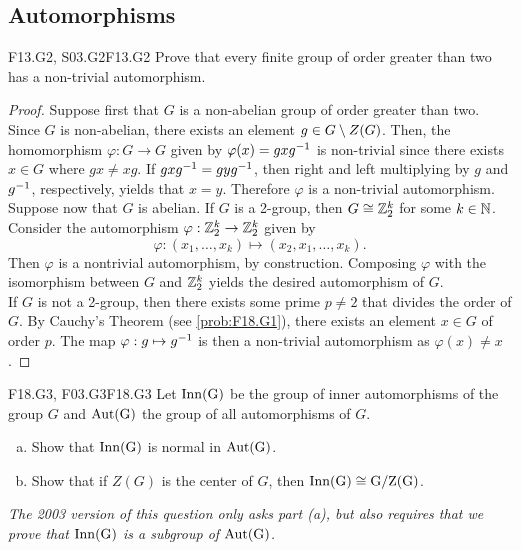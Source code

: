 \documentclass[../../AlgebraQualSolutions.tex]{subfiles}
\begin{document}
\subsection{Automorphisms}

\begin{prob}{F13.G2, S03.G2}{F13.G2}
	Prove that every finite group of order greater than two has a non-trivial automorphism.
\end{prob}

\begin{proof}
Suppose first that $G$ is a non-abelian group of order greater than two. Since $G$ is non-abelian, there exists an element $g \in G \setminus Z(G)$. Then, the homomorphism $\varphi: G \to G$ given by $\varphi(x) = gxg^{-1}$ is non-trivial since there exists $x \in G$ where $gx \neq xg$. If $gxg^{-1} = gyg^{-1}$, then right and left multiplying by $g$ and $g^{-1}$, respectively, yields that $x = y$. Therefore $\varphi$ is a non-trivial automorphism.\\

Suppose now that $G$ is abelian. If $G$ is a 2-group, then $G \cong \mathbb{Z}_2^k$ for some $k \in \mathbb{N}$. Consider the automorphism $\varphi: \mathbb{Z}_2^k \to \mathbb{Z}_2^k$ given by 
	\[\varphi: (x_1,\ldots, x_k) \mapsto (x_2, x_1, \ldots, x_k).\]
Then $\varphi$ is a nontrivial automorphism, by construction. Composing $\varphi$ with the isomorphism between $G$ and $\mathbb{Z}_2^k$ yields the desired automorphism of $G$.\\

If $G$ is not a 2-group, then there exists some prime $p \neq 2$ that divides the order of $G$. By Cauchy's Theorem (see \ref{prob:F18.G1}), there exists an element $x \in G$ of order $p$. The map $\varphi: g \mapsto g^{-1}$ is then a non-trivial automorphism as $\varphi(x) \neq x$.
\end{proof}

\begin{prob}{F18.G3, F03.G3}{F18.G3}
    Let $\rm{Inn}(G)$ be the group of inner automorphisms of the group $G$ and $\rm{Aut}(G)$ the group of all automorphisms of $G$.
    \begin{enumerate}[(a)]
        \item Show that $\rm{Inn}(G)$ is normal in $\rm{Aut}(G)$.
        \item Show that if $Z(G)$ is the center of $G$, then $\rm{Inn}(G) \cong G/Z(G)$.
    \end{enumerate}
\end{prob}

\emph{The 2003 version of this question only asks part (a), but also requires that we prove that $\rm{Inn}(G)$ is a subgroup of $\rm{Aut}(G)$.}
\end{document}
